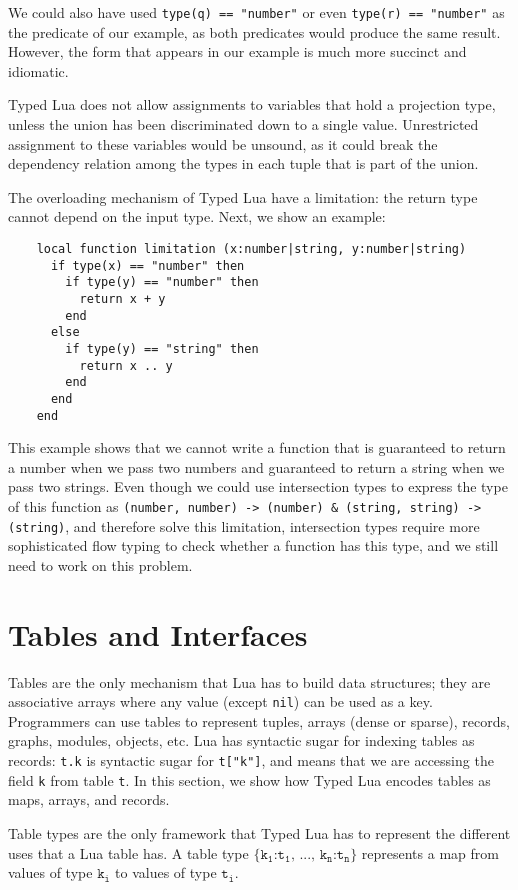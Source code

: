 We could also have used \texttt{type(q) == "number"} or
even \texttt{type(r) == "number"} as the predicate of our example,
as both predicates would produce the same result.
However, the form that appears in our example is much more succinct and idiomatic.

Typed Lua does not allow assignments to variables that hold a projection type,
unless the union has been discriminated down to a single value.
Unrestricted assignment to these variables would be unsound,
as it could break the dependency relation among the types in each tuple
that is part of the union.

The overloading mechanism of Typed Lua have a limitation:
the return type cannot depend on the input type.
Next, we show an example:
\begin{verbatim}
    local function limitation (x:number|string, y:number|string)
      if type(x) == "number" then
        if type(y) == "number" then
          return x + y
        end
      else
        if type(y) == "string" then
          return x .. y
        end
      end
    end
\end{verbatim}

This example shows that we cannot write a function that is
guaranteed to return a number when we pass two numbers and
guaranteed to return a string when we pass two strings.
Even though we could use intersection types to express the type
of this function as
\texttt{(number, number) -> (number) \string&
(string, string) -> (string)},
and therefore solve this limitation,
intersection types require more sophisticated flow typing to
check whether a function has this type,
and we still need to work on this problem.

\section{Tables and Interfaces}

Tables are the only mechanism that Lua has to build data structures;
they are associative arrays where any value (except \texttt{nil})
can be used as a key.
Programmers can use tables to represent tuples, arrays (dense or sparse),
records, graphs, modules, objects, etc.
Lua has syntactic sugar for indexing tables as records:
\texttt{t.k} is syntactic sugar for \texttt{t["k"]}, and means that
we are accessing the field \texttt{k} from table \texttt{t}. 
In this section, we show how Typed Lua encodes tables as maps,
arrays, and records.

Table types are the only framework that Typed Lua has to represent
the different uses that a Lua table has.
A table type $\texttt{\{k}{_\texttt{1}}\texttt{:t}_{\texttt{1}}
\texttt{, ..., k}{_\texttt{n}}\texttt{:t}_{\texttt{n}}\texttt{\}}$ represents a map
from values of type $\texttt{k}_{\texttt{i}}$ to values of type
$\texttt{t}_{\texttt{i}}$.

